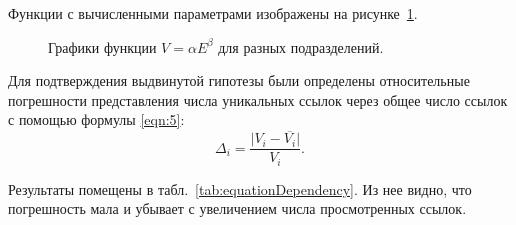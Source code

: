 Функции с вычисленными параметрами изображены на рисунке~\cref{fig:spbuDepartments}.

\begin{figure}[ht]
	\caption{Графики функции \(V = \alpha E^{\beta} \) для разных подразделений.}\label{fig:spbuDepartments}
\end{figure}

Для подтверждения выдвинутой гипотезы были определены относительные погрешности представления числа уникальных ссылок через общее число ссылок с помощью формулы \cref{eqn:5}:
\[
\Delta_i = \frac{\lvert V_i - \overline{V_i} \rvert}{V_i}.
\]

Результаты помещены в табл.~\cref{tab:equationDependency}. Из нее видно, что погрешность мала и убывает с увеличением числа просмотренных ссылок.

